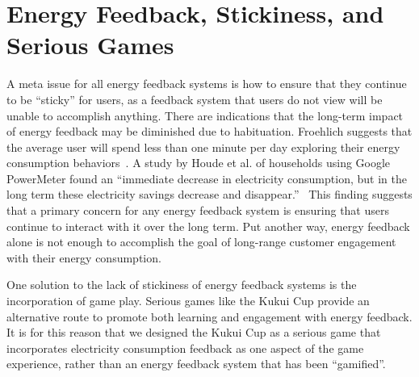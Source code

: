 \documentclass[10pt, conference, compsocconf]{IEEEtran}
\begin{document}
%


\section{Energy Feedback, Stickiness, and Serious Games}

A meta issue for all energy feedback systems is how to ensure that they continue to be ``sticky'' for users, as a feedback system that users do not view will be unable to accomplish anything. There are indications that the long-term impact of energy feedback may be diminished due to habituation. Froehlich suggests that the average user will spend less than one minute per day exploring their energy consumption behaviors~\cite{Froehlich2010-BECC}. A study by Houde et al. of households using Google PowerMeter found an ``immediate decrease in electricity consumption, but in the long term these electricity savings decrease and disappear.''~\cite{Houde2013-powermeter} This finding suggests that a primary concern for any energy feedback system is ensuring that users continue to interact with it over the long term. Put another way, energy feedback alone is not enough to accomplish the goal of long-range customer engagement with their energy consumption.

One solution to the lack of stickiness of energy feedback systems is the incorporation of game play. Serious games like the Kukui Cup provide an alternative route to promote both learning and engagement with energy feedback. It is for this reason that we designed the Kukui Cup as a serious game that incorporates electricity consumption feedback as one aspect of the game experience, rather than an energy feedback system that has been ``gamified''. 
\end{document}
